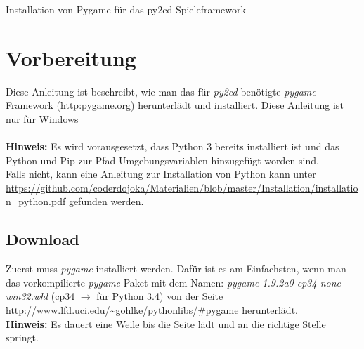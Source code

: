 \documentclass[ngerman,oneside, a4letter]{article}
\begin{document}
{\huge Installation von Pygame für das py2cd-Spieleframework}

\section{Vorbereitung}
Diese Anleitung ist beschreibt, wie man das für \emph{py2cd} benötigte \emph{pygame}-Framework (\url{http:pygame.org}) herunterlädt und installiert. Diese Anleitung ist nur für Windows 
\\
\\
\textbf{Hinweis:} Es wird vorausgesetzt, dass Python 3 bereits installiert ist und das Python und Pip zur Pfad-Umgebungsvariablen hinzugefügt worden sind.
\\
Falls nicht, kann eine Anleitung zur Installation von Python kann unter \url{https://github.com/coderdojoka/Materialien/blob/master/Installation/installation_python.pdf} gefunden werden.

\subsection{Download}
Zuerst muss \emph{pygame} installiert werden. Dafür ist es am Einfachsten, wenn man das vorkompilierte \emph{pygame}-Paket mit dem Namen: \emph{pygame-1.9.2a0-cp34-none-win32.whl} (cp34 $\rightarrow$ für Python 3.4) von der Seite \url{http://www.lfd.uci.edu/~gohlke/pythonlibs/#pygame} herunterlädt.
\\
\textbf{Hinweis:} Es dauert eine Weile bis die Seite lädt und an die richtige Stelle springt.

\begin{center}
\end{center}
\end{document}
